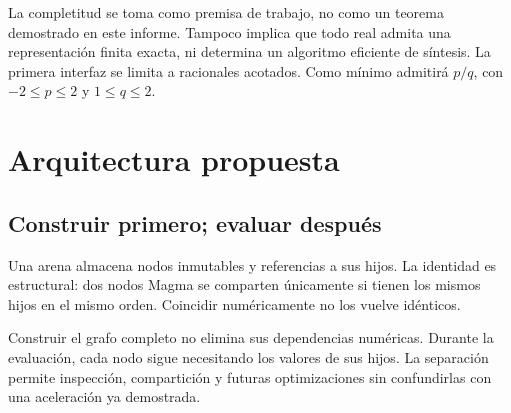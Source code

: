 \documentclass[11pt,a4paper]{article}
\begin{document}
La completitud se toma como premisa de trabajo, no como un teorema demostrado
en este informe. Tampoco implica que todo real admita una representación
finita exacta, ni determina un algoritmo eficiente de síntesis. La primera
interfaz se limita a racionales acotados. Como mínimo admitirá \(p/q\), con
\(-2\leq p\leq2\) y \(1\leq q\leq2\).
\newpage

\section{Arquitectura propuesta}
\subsection{Construir primero; evaluar después}
Una arena almacena nodos inmutables y referencias a sus hijos. La identidad
es estructural: dos nodos Magma se comparten únicamente si tienen los mismos
hijos en el mismo orden. Coincidir numéricamente no los vuelve idénticos.

\begin{center}
\end{center}

Construir el grafo completo no elimina sus dependencias numéricas. Durante
la evaluación, cada nodo sigue necesitando los valores de sus hijos. La
separación permite inspección, compartición y futuras optimizaciones sin
confundirlas con una aceleración ya demostrada.
\end{document}
